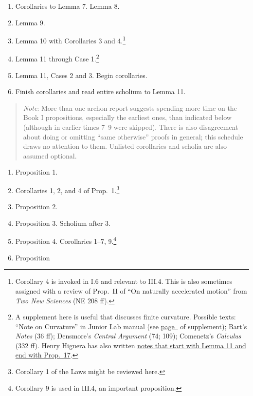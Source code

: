 \documentclass[10pt]{article}
\begin{document}
{\begin{enumerate}[resume*]
{			might assign a review of
			\emph{Elements} III.16 with Lemma 6
			and allow two days here.} \item
		Corollaries to Lemma 7. Lemma 8.  \item
		Lemma 9.  \item Lemma 10 with Corollaries 3
		and 4.\footnote{Corollary 4 is invoked in
			I.6 and relevant to III.4. This is
			also sometimes assigned with a
			review of Prop.~II of ``On naturally
			accelerated motion'' from \emph{Two
				New Sciences} (NE 208 ff).}
	\item Lemma 11 through Case 1.\footnote{A supplement
			here is useful that discusses finite
			curvature. Possible texts: ``Note on
			Curvature'' in Junior Lab manual
			(see
			\hyperref[supple.74]{page~\pageref{supple.74}}
			of supplement); Bart's \emph{Notes}
			(36 ff); Densmore's \emph{Central
				Argument} (74; 109);
			Comenetz's \emph{Calculus} (332 ff).
			Henry Higuera has also written
			\href{https://drive.google.com/file/d/1YZfQPV6poJMzZvZ3DyGfJopGkzy7oe7K/view?usp=sharing}{notes
			that start with Lemma 11 and
			end with Prop.~17}.}
	\item Lemma 11,
		Cases 2 and 3.  Begin corollaries.  \item
		Finish corollaries and read entire scholium
		to Lemma 11.  \end{enumerate}
		\begin{quote}
		\vspace{-0.5em}
	\small{\emph{Note}: More than one archon report
		suggests spending more time on the Book I
		propositions, especially the earliest ones,
		than indicated below (although in earlier
		times 7--9 were skipped).  There is also
		disagreement about doing or omitting ``same
		otherwise'' proofs in general; this schedule
		draws no attention to them. Unlisted
		corollaries and scholia are also assumed
		optional.} \end{quote}
\begin{enumerate}[resume*] \item Proposition 1.  \item
		Corollaries 1, 2, and 4 of
		Prop.~1.\footnote{Corollary 1 of the Laws
			might be reviewed here.} \item
		Proposition 2.  \item Proposition 3.
		Scholium after 3.  \item Proposition 4.
		Corollaries 1--7, 9.\footnote{Corollary 9 is used in III.4, an important proposition.}  \item Proposition

\end{enumerate}}
\end{document}

